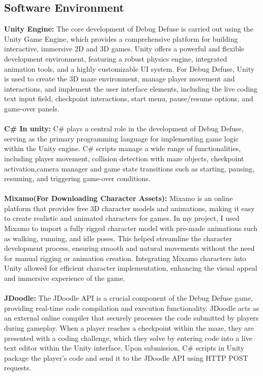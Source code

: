  \subsection{Software Environment}
 \textbf{Unity Engine:}
 The core development of Debug Defuse is carried out using the Unity Game Engine, which provides a comprehensive platform for building interactive, immersive 2D and 3D games. Unity offers a powerful and flexible development environment, featuring a robust physics engine, integrated animation tools, and a highly customizable UI system. For Debug Defuse, Unity is used to create the 3D maze environment, manage player movement and interactions, and implement the user interface elements, including the live coding text input field, checkpoint interactions, start menu, pause/resume options, and game-over panels.\\\\
 \textbf{C\# In unity:}
 C\# plays a central role in the development of Debug Defuse, serving as the primary programming language for implementing game logic within the Unity engine. C\# scripts manage a wide range of functionalities, including player movement, collision detection with maze objects, checkpoint activation,camera manager and game state transitions such as starting, pausing, resuming, and triggering game-over conditions.
 \\\\
 \textbf{Mixamo(For Downloading Character Assets):}
 Mixamo is an online platform that provides free 3D character models and animations, making it easy to create realistic and animated characters for games. In my project, I used Mixamo to import a fully rigged character model with pre-made animations such as walking, running, and idle poses. This helped streamline the character development process, ensuring smooth and natural movements without the need for manual rigging or animation creation. Integrating Mixamo characters into Unity allowed for efficient character implementation, enhancing the visual appeal and immersive experience of the game.
\\\\
 \textbf{JDoodle:}
 The JDoodle API is a crucial component of the Debug Defuse game, providing real-time code compilation and execution functionality. JDoodle acts as an external online compiler that securely processes the code submitted by players during gameplay. When a player reaches a checkpoint within the maze, they are presented with a coding challenge, which they solve by entering code into a live text editor within the Unity interface. Upon submission, C\# scripts in Unity package the player's code and send it to the JDoodle API using HTTP POST requests.
